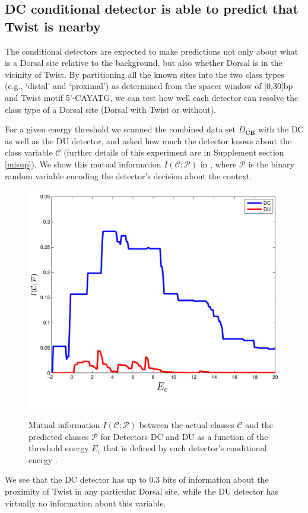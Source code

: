 \subsection* {DC conditional detector is able to predict that Twist is nearby} 
The conditional detectors are expected to make predictions not only about what is a Dorsal site relative to the background, but also whether Dorsal is in the vicinity of Twist.  By partitioning all the known sites into the two class types (e.g., `distal' and `proximal') as determined from the spacer window of [0,30]bp and Twist motif 5'-CAYATG, we can test how well each detector can resolve the class type of a Dorsal site (Dorsal with Twist or without).  

For a given energy threshold we scanned the combined data set $D_{\textbf{CB}}$ with the DC as well as the DU detector, and asked how much the detector knows about the class variable $\mathcal C$ (further details of this experiment are in Supplement section \ref{misup}).  We show this mutual information $I(\mathcal C;\mathcal P)$ in  , where $\mathcal P$ is the binary random variable encoding the detector's decision about the context. 
\begin{figure}
  \includegraphics[]{miclasses-new.pdf}\\
  \caption{Mutual information $I(\mathcal C;\mathcal P)$ between the actual classes $\mathcal C$ and the predicted classes $\mathcal P$ for Detectors DC and DU as a function of the threshold energy $E_c$ that is defined by each detector's conditional energy .
    \label{MiSP}}
\end{figure}
We see that the DC detector has up to 0.3 bits of information about the proximity of Twist in any particular Dorsal site, while the DU detector has virtually no information about this variable. 

